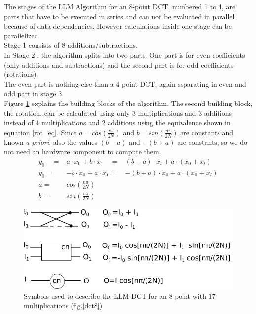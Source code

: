         The stages of the LLM Algorithm for an 8-point DCT, numbered 1 to 4, are parts that have to be executed in series and can not be evaluated in parallel because of data dependencies. However calculations inside one stage can be parallelized. \\
        Stage 1 consists of 8 additions/subtractions. \\
        In Stage 2 , the algorithm splits into two parts. One part is for even coefficients (only additions and subtractions) and the second part is for odd coefficients (rotations). \\
         The even part is nothing else than a 4-point DCT, again separating in even and odd part in stage 3.\\
         Figure \ref{dct8_scheme} explains the building blocks of the algorithm.  
     The second building block, the rotation, can be calculated using only 3 multiplications and 3 additions instead of 4 multiplications and 2 additions using the equivalence shown in equation \ref{rot_eq}.
     Since $ a=cos(\frac{n\pi}{2N}) $ and $ b=sin(\frac{n\pi}{2N}) $ are constants and known \textit{a priori}, also the values $ (b-a) $ and $ -(b+a) $ are constants, so we do not need an hardware component to compute them.
     \begin{equation}\label{rot_eq}
     \begin{aligned}
     	y_{0}\quad=&a\cdot x_{0} + b\cdot x_{1} \quad=& (b - a)\cdot x_{l}+a\cdot (x_{0}+x_{l})\\
     	y_{0}= & -b\cdot x_{0} + a\cdot x_{1}= &  -(b+a)\cdot x_{0}+a\cdot (x_{0}+x_{l})\\
     	a=&cos(\frac{n\pi}{2N})&\\
     	b=&sin(\frac{n\pi}{2N})&
     	\end{aligned}
     \end{equation}
     \bigskip
              \begin{figure}[h!]
              	\centering
              	\includegraphics[width=\textwidth]{imm/dct/dct8_scheme.png} 	\caption{Symbols used to describe the LLM DCT for an 8-point with 17 multiplications (fig.\ref{dct8})} 
              	\label{dct8_scheme}
              \end{figure}
        
